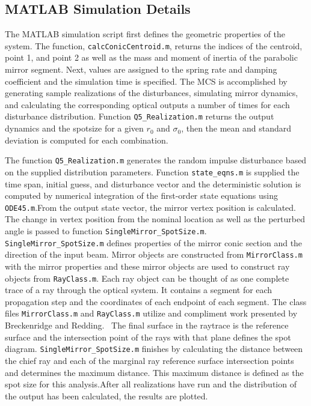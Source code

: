  \subsection*{MATLAB Simulation Details}

\begin{sloppypar} 
The MATLAB simulation script first defines the geometric properties of the system. The function, \texttt{calcConicCentroid.m}, returns the indices of the centroid, point 1, and point 2 as well as the mass and moment of inertia of the parabolic mirror segment. Next, values are assigned to the spring rate and damping coefficient and the simulation time is specified. The MCS is accomplished by generating sample realizations of the disturbances, simulating mirror dynamics, and calculating the corresponding optical outputs a number of times for each disturbance distribution. Function \texttt{Q5\_Realization.m} returns the output dynamics and the spotsize for a given $r_0$ and $\sigma_0$, then the mean and standard deviation is computed for each combination. \\
 \end{sloppypar}
 
The function \texttt{Q5\_Realization.m} generates the random impulse disturbance based on the supplied distribution parameters. Function \texttt{state\_eqns.m} is supplied the time span, initial guess, and disturbance vector and the deterministic solution is computed by numerical integration of the first-order state equations using \texttt{ODE45.m}.From the output state vector, the mirror vertex position is calculated. The change in vertex position from the nominal location as well as the perturbed angle is passed to function \texttt{SingleMirror\_SpotSize.m}.\\
 
\texttt{SingleMirror\_SpotSize.m} defines properties of the mirror conic section and the direction of the input beam. Mirror objects are constructed from \texttt{MirrorClass.m} with the mirror properties and these mirror objects are used to construct ray objects from \texttt{RayClass.m}. Each ray object can be thought of as one complete trace of a ray through the optical system. It contains a segment for each propagation step and the coordinates of each endpoint of each segment. The class files \texttt{MirrorClass.m} and \texttt{RayClass.m} utilize and compliment work presented by Breckenridge and Redding.~\cite{RedBreck} The final surface in the raytrace is the reference surface and the intersection point of the rays with that plane defines the spot diagram. \texttt{SingleMirror\_SpotSize.m} finishes by calculating the distance between the chief ray and each of the marginal ray reference surface intersection points and determines the maximum distance. This maximum distance is defined as the spot size for this analysis.After all realizations have run and the distribution of the output has been calculated, the results are plotted.
